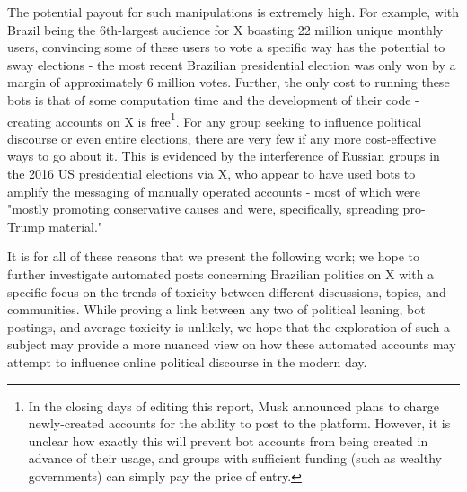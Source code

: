 \documentclass[a4paper,11pt]{article}  %
\begin{document}
	The potential payout for such manipulations is extremely high. For example, with Brazil being the 6th-largest audience for X boasting 22 million unique monthly users\parencite{TwitterGlobalAudience}, convincing some of these users to vote a specific way has the potential to sway elections - the most recent Brazilian presidential election was only won by a margin of approximately 6 million votes\parencite{SIGEleicaoResultados}. Further, the only cost to running these bots is that of some computation time and the development of their code - creating accounts on X is free\footnote{In the closing days of editing this report, Musk announced plans to charge newly-created accounts for the ability to post to the platform\parencite{espositoElonMuskConfirms2024}. However, it is unclear how exactly this will prevent bot accounts from being created in advance of their usage, and groups with sufficient funding (such as wealthy governments) can simply pay the price of entry.}. For any group seeking to influence political discourse or even entire elections, there are very few if any more cost-effective ways to go about it. This is evidenced by the interference of Russian groups in the 2016 US presidential elections via X, who appear to have used bots to amplify the messaging of manually operated accounts - most of which were "mostly promoting conservative causes and were, specifically, spreading pro-Trump material."\parencite{badawyAnalyzingDigitalTraces2018}
	
	It is for all of these reasons that we present the following work; we hope to further investigate automated posts concerning Brazilian politics on X with a specific focus on the trends of toxicity between different discussions, topics, and communities. While proving a link between any two of political leaning, bot postings, and average toxicity is unlikely, we hope that the exploration of such a subject may provide a more nuanced view on how these automated accounts may attempt to influence online political discourse in the modern day.
\end{document}

